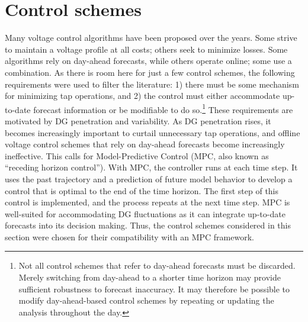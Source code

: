 \documentclass[10pt,letterpaper]{article}
\begin{document}
\section{Control schemes}
\label{sec:control}
Many voltage control algorithms have been proposed over the years. Some strive to maintain a voltage profile at all costs; others seek to minimize losses. Some algorithms rely on day-ahead forecasts, while others operate online; some use a combination. As there is room here for just a few control schemes, the following requirements were used to filter the literature: 1) there must be some mechanism for minimizing tap operations, and 2) the control must either accommodate up-to-date forecast information or be modifiable to do so.\footnote{Not all control schemes that refer to day-ahead forecasts must be discarded. Merely switching from day-ahead to a shorter time horizon may provide sufficient robustness to forecast inaccuracy. It may therefore be possible to modify day-ahead-based control schemes by repeating or updating the analysis throughout the day.} These requirements are motivated by DG penetration and variability. As DG penetration rises, it becomes increasingly important to curtail unnecessary tap operations, and offline voltage control schemes that rely on day-ahead forecasts become increasingly ineffective. This calls for Model-Predictive Control (MPC, also known as ``receding horizon control''). With MPC, the controller runs at each time step. It uses the past trajectory and a prediction of future model behavior to develop a control that is optimal to the end of the time horizon. The first step of this control is implemented, and the process repeats at the next time step. MPC is well-suited for accommodating DG fluctuations as it can integrate up-to-date forecasts into its decision making. Thus, the control schemes considered in this section were chosen for their compatibility with an MPC framework.
\end{document}
